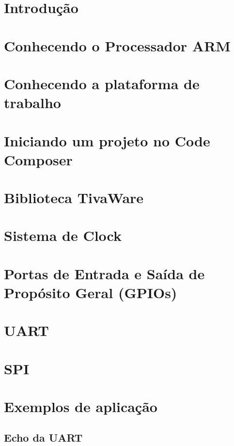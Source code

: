 \documentclass[a4paper,10pt,oneside]{book}
\begin{document}
\maketitle

\listoffigures
\listoftables

\tableofcontents

\chapter{Introdução}


\chapter{Conhecendo o Processador ARM}


\chapter{Conhecendo a plataforma de trabalho}


\chapter{Iniciando um projeto no Code Composer}


\chapter{Biblioteca TivaWare}


\chapter{Sistema de Clock}


\chapter{Portas de Entrada e Saída de Propósito Geral (GPIOs)}


\chapter{UART}


\chapter{SPI}


\chapter{Exemplos de aplicação}

\section{Echo da UART}





\end{document}
